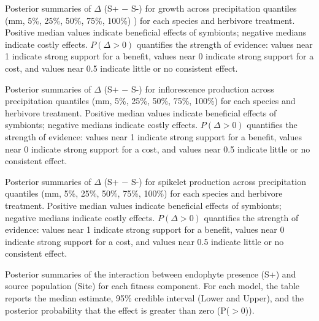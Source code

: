 \documentclass[12pt]{article}\usepackage[]{graphicx}\usepackage[dvipsnames]{xcolor}
\begin{document}
\begin{table}[ht]
    \centering
    \caption{Posterior summaries of $\Delta$ (S+ $-$ S-) for growth across precipitation quantiles (mm, 5\%, 25\%, 50\%, 75\%, 100\%) ) for each species and herbivore treatment.
    Positive median values indicate beneficial effects of symbionts; negative medians indicate costly effects. 
    $P(\Delta>0)$ quantifies the strength of evidence: values near 1 indicate
    strong support for a benefit, values near 0 indicate strong support for a cost, and values near 0.5 indicate little or no consistent effect.}
    \label{tab:delta_summary_grow}
    
\end{table}
\clearpage

\begin{table}[ht]
    \centering
    \caption{Posterior summaries of $\Delta$ (S+ $-$ S-) for inflorescence production across precipitation quantiles (mm, 5\%, 25\%, 50\%, 75\%, 100\%) for each species and herbivore treatment.
    Positive median values indicate beneficial effects of symbionts; negative medians indicate costly effects.
    $P(\Delta>0)$ quantifies the strength of evidence: values near 1 indicate strong support for a benefit, values near 0 indicate strong support for a cost, and values near 0.5 indicate little or no consistent effect.}
    \label{tab:delta_summary_flow}
    
\end{table}
\clearpage

\begin{table}[ht]
    \centering
    \caption{Posterior summaries of $\Delta$ (S+ $-$ S-) for spikelet production across precipitation quantiles (mm, 5\%, 25\%, 50\%, 75\%, 100\%) for each species and herbivore treatment.
    Positive median values indicate beneficial effects of symbionts; negative medians indicate costly effects.
    $P(\Delta>0)$ quantifies the strength of evidence: values near 1 indicate strong support for a benefit, values near 0 indicate strong support for a cost, and values near 0.5 indicate little or no consistent effect.}
    \label{tab:delta_summary_spike}
    
\end{table}
\clearpage

\begin{table}
    \centering
    \small
        
           \caption{Posterior summaries of the interaction between endophyte presence (S+) and source population (Site) for each fitness component. For each model, the table reports the median estimate, 95\% credible interval (Lower and Upper), and the posterior probability that the effect is greater than zero (P($>0$)).}
    \label{tab:posterior_soil}
\end{table}
\clearpage
\end{document}
